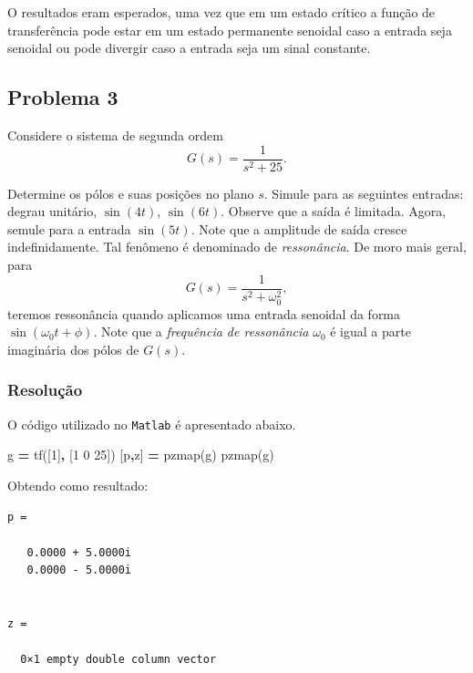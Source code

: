 \documentclass[
]{book}
\newenvironment{Shaded}{\begin{snugshade}}{\end{snugshade}}
\newcommand{\FloatTok}[1]{\textcolor[rgb]{0.00,0.00,0.81}{#1}}
\newcommand{\NormalTok}[1]{#1}
\newcommand{\OperatorTok}[1]{\textcolor[rgb]{0.81,0.36,0.00}{\textbf{#1}}}
\newcommand{\VariableTok}[1]{\textcolor[rgb]{0.00,0.00,0.00}{#1}}
\begin{document}
O resultados eram esperados, uma vez que em um estado crítico a função de transferência pode estar em um estado permanente senoidal caso a entrada seja senoidal ou pode divergir caso a entrada seja um sinal constante.

\hypertarget{problema-3}{%
\subsection*{Problema 3}\label{problema-3}}

Considere o sistema de segunda ordem
\[
G(s) = \frac {1}{s^2 +25}.
\]

Determine os pólos e suas posições no plano \(s\). Simule para as seguintes entradas: degrau unitário, \(\sin (4t)\), \(\sin(6t)\). Observe que a saída é limitada. Agora, semule para a entrada \(\sin(5t)\). Note que a amplitude de saída cresce indefinidamente. Tal fenômeno é denominado de \emph{ressonância}. De moro mais geral, para
\[
G(s) = \frac {1}{s^2+\omega_0^2},
\]
teremos ressonância quando aplicamos uma entrada senoidal da forma \(\sin(\omega_0t + \phi)\). Note que a \emph{frequência de ressonância} \(\omega_0\) é igual a parte imaginária dos pólos de \(G(s)\).

\hypertarget{resoluuxe7uxe3o-2}{%
\subsubsection*{Resolução}\label{resoluuxe7uxe3o-2}}

O código utilizado no \texttt{Matlab} é apresentado abaixo.

\begin{Shaded}
\begin{Highlighting}[]
\VariableTok{g} \OperatorTok{=} \VariableTok{tf}\NormalTok{([}\FloatTok{1}\NormalTok{]}\OperatorTok{,}\NormalTok{ [}\FloatTok{1} \FloatTok{0} \FloatTok{25}\NormalTok{])}
\NormalTok{[}\VariableTok{p}\OperatorTok{,}\VariableTok{z}\NormalTok{] }\OperatorTok{=} \VariableTok{pzmap}\NormalTok{(}\VariableTok{g}\NormalTok{)}
\VariableTok{pzmap}\NormalTok{(}\VariableTok{g}\NormalTok{)}
\end{Highlighting}
\end{Shaded}

Obtendo como resultado:

\begin{verbatim}
p =

   0.0000 + 5.0000i
   0.0000 - 5.0000i


z =

  0×1 empty double column vector
\end{verbatim}
\end{document}
